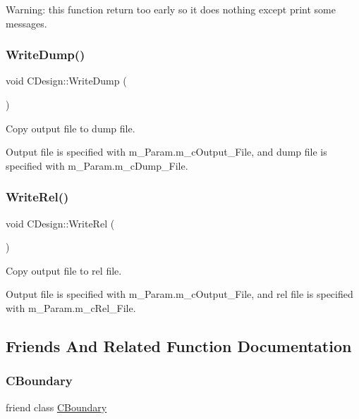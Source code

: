 Warning\+: this function return too early so it does nothing except print some messages.\mbox{\label{classCDesign_a984162e6e0b47da02f4a34e176f0a569}} 
\subsubsection{\texorpdfstring{WriteDump()}{WriteDump()}}
{\footnotesize\ttfamily void C\+Design\+::\+Write\+Dump (\begin{DoxyParamCaption}{ }\end{DoxyParamCaption})}



Copy output file to dump file. 

Output file is specified with m\+\_\+\+Param.\+m\+\_\+c\+Output\+\_\+\+File, and dump file is specified with m\+\_\+\+Param.\+m\+\_\+c\+Dump\+\_\+\+File. \mbox{\label{classCDesign_a69b246b26e9ce4c4edbf74065529b89f}} 
\subsubsection{\texorpdfstring{WriteRel()}{WriteRel()}}
{\footnotesize\ttfamily void C\+Design\+::\+Write\+Rel (\begin{DoxyParamCaption}{ }\end{DoxyParamCaption})}



Copy output file to rel file. 

Output file is specified with m\+\_\+\+Param.\+m\+\_\+c\+Output\+\_\+\+File, and rel file is specified with m\+\_\+\+Param.\+m\+\_\+c\+Rel\+\_\+\+File. 

\subsection{Friends And Related Function Documentation}
\mbox{\label{classCDesign_aab1ae13155639bc23234a972a3296244}} 
\subsubsection{\texorpdfstring{CBoundary}{CBoundary}}
{\footnotesize\ttfamily friend class \mbox{\hyperlink{classCBoundary}{C\+Boundary}}\hspace{0.3cm}{\ttfamily [friend]}}

